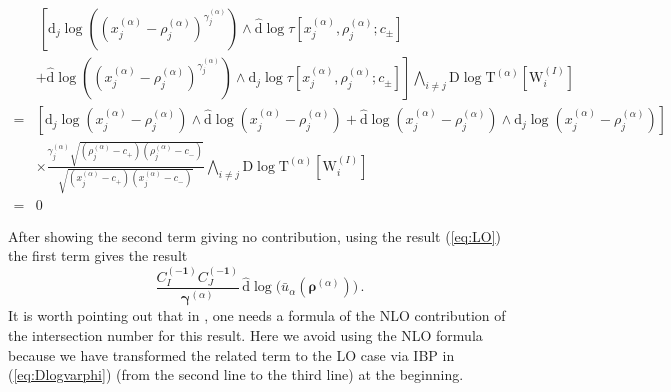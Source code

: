 \documentclass[a4paper,11pt]{article}
\newcommand{\nn}{\nonumber}
\newcommand{\nd}{\mathrm{d}}
\newcommand{\nD}{\mathrm{D}}
\newcommand{\nT}{\mathrm{T}}
\newcommand{\nW}{\mathrm{W}}
\newcommand{\nds}{\hat{\mathrm{d}}}
\newcommand{\be}{\begin{equation}}
\def\eref#1{(\ref{#1})}
\begin{document}
\begin{align}
& ~\left[ \nd_{j} \log \left(\left( x_j^{(\alpha)} - \rho_j^{(\alpha)} \right)^{\gamma_j^{(\alpha)}} \right) \wedge \nds \log \tau\left[x_j^{(\alpha)} ,\rho_j^{(\alpha)};c_{\pm} \right]  \right. \nn\\
&\left. +  \nds \log \left(\left( x_j^{(\alpha)} - \rho_j^{(\alpha)} \right)^{\gamma_j^{(\alpha)}} \right) \wedge \nd_j \log \tau\left[x_j^{(\alpha)} ,\rho_j^{(\alpha)};c_{\pm} \right]   \right] 
\bigwedge_{i\neq j}\nD \log \nT^{(\alpha)}\left[\nW^{(I)}_i \right]   \nn\\
=& \left[ \nd_{j} \log \left( x_j^{(\alpha)} - \rho_j^{(\alpha)} \right)\wedge \nds \log \left( x_j^{(\alpha)} - \rho_j^{(\alpha)} \right)  + \nds \log \left( x_j^{(\alpha)} - \rho_j^{(\alpha)} \right)\wedge \nd_j \log \left( x_j^{(\alpha)} - \rho_j^{(\alpha)} \right)  \right] \nn\\
&  \times \frac{\gamma_j^{(\alpha)} \sqrt{\left(\rho_j^{(\alpha)}-c_+\right) \left(\rho_j^{(\alpha)}-c_-\right)}   }{ \sqrt{\left(x_j^{(\alpha)}-c_+ \right) \left(x_j^{(\alpha)}-c_- \right)} }  
\bigwedge_{i\neq j}\nD \log \nT^{(\alpha)}\left[\nW^{(I)}_i \right]   \nn\\
=&0
\end{align}

After showing the second term giving no contribution, using the result \eref{eq:LO} the first term  gives the
result
\be
\frac{C_I^{(\bm{-1})} C_J^{(\bm{-1})}}{\bm{\gamma}^{(\alpha)}} \, \nds \log \Big( \bar{u}_\alpha(\bm{\rho}^{(\alpha)}) \Big) \,.  \label{eq:CSPdlog}
\end{equation}
It is worth pointing out that 
in \cite{Chen:2023kgw}, one needs a formula of the NLO contribution of the intersection number for this result. Here we avoid using the NLO formula because we have transformed the related term to the LO case via IBP in  \eref{eq:Dlogvarphi} 
(from the second line to the third line) at the beginning.


\end{document}
